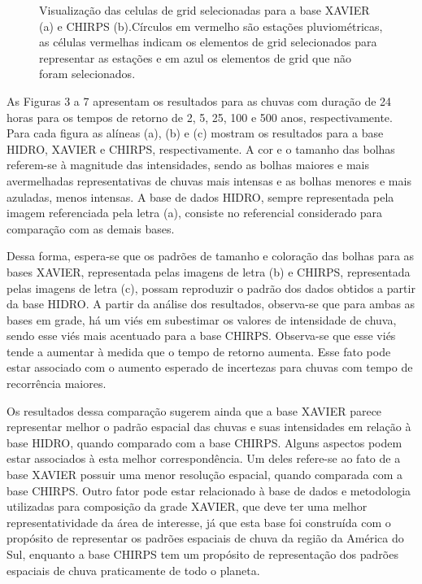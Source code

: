 \documentclass[
]{agujournal2019}
\begin{document}
\begin{figure}
\begin{minipage}{\linewidth}
{}


\end{minipage}%

\caption{\label{fig-Figura2}Visualização das celulas de grid
selecionadas para a base XAVIER (a) e CHIRPS (b).Círculos em vermelho
são estações pluviométricas, as células vermelhas indicam os elementos
de grid selecionados para representar as estações e em azul os elementos
de grid que não foram selecionados.}

\end{figure}%

As Figuras 3 a 7 apresentam os resultados para as chuvas com duração de
24 horas para os tempos de retorno de 2, 5, 25, 100 e 500 anos,
respectivamente. Para cada figura as alíneas (a), (b) e (c) mostram os
resultados para a base HIDRO, XAVIER e CHIRPS, respectivamente. A cor e
o tamanho das bolhas referem-se à magnitude das intensidades, sendo as
bolhas maiores e mais avermelhadas representativas de chuvas mais
intensas e as bolhas menores e mais azuladas, menos intensas. A base de
dados HIDRO, sempre representada pela imagem referenciada pela letra
(a), consiste no referencial considerado para comparação com as demais
bases.

Dessa forma, espera-se que os padrões de tamanho e coloração das bolhas
para as bases XAVIER, representada pelas imagens de letra (b) e CHIRPS,
representada pelas imagens de letra (c), possam reproduzir o padrão dos
dados obtidos a partir da base HIDRO. A partir da análise dos
resultados, observa-se que para ambas as bases em grade, há um viés em
subestimar os valores de intensidade de chuva, sendo esse viés mais
acentuado para a base CHIRPS. Observa-se que esse viés tende a aumentar
à medida que o tempo de retorno aumenta. Esse fato pode estar associado
com o aumento esperado de incertezas para chuvas com tempo de
recorrência maiores.

Os resultados dessa comparação sugerem ainda que a base XAVIER parece
representar melhor o padrão espacial das chuvas e suas intensidades em
relação à base HIDRO, quando comparado com a base CHIRPS. Alguns
aspectos podem estar associados à esta melhor correspondência. Um deles
refere-se ao fato de a base XAVIER possuir uma menor resolução espacial,
quando comparada com a base CHIRPS. Outro fator pode estar relacionado à
base de dados e metodologia utilizadas para composição da grade XAVIER,
que deve ter uma melhor representatividade da área de interesse, já que
esta base foi construída com o propósito de representar os padrões
espaciais de chuva da região da América do Sul, enquanto a base CHIRPS
tem um propósito de representação dos padrões espaciais de chuva
praticamente de todo o planeta.
\end{document}
